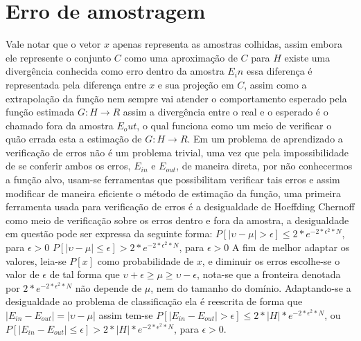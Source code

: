 \documentclass[pfc]{imetex}
\begin{document}
\section{Erro de amostragem}
   \newline
    Vale notar que o vetor $x$ apenas representa as amostras colhidas, assim embora ele represente o conjunto $C$ como uma aproximação de $C$ para $H$ existe uma divergência conhecida como erro dentro da amostra $E_in$ essa diferença é representada pela diferença entre $x$ e sua projeção em $C$, assim como a extrapolação da função nem sempre vai atender o comportamento esperado pela função estimada $G: H \rightarrow R$ assim a divergência entre o real e o esperado é o chamado fora da amostra $E_out$, o qual funciona como um meio de verificar o quão errada esta a estimação de $G: H \rightarrow R$.
    \newline
    Em um problema de aprendizado a verificação de erros não é um problema trivial, uma vez que pela impossibilidade de se conferir ambos os erros, $E_{in}$ e $E_{out}$, de maneira direta, por não conhecermos a função alvo, usam-se ferramentas que possibilitam verificar tais erros e assim modificar de maneira eficiente o método de estimação da função, uma primeira ferramenta usada para verificação de erros é a desigualdade de Hoeffding Chernoff como meio de verificação sobre os erros dentro e fora da amostra, a desigualdade em questão pode ser expressa da seguinte forma:
    \newline
    $P[|\upsilon - \mu|>\epsilon] \leq 2*e^{-2*\epsilon^2*N}$, para $\epsilon>0$
    \newline
    $P[|\upsilon - \mu|\leq\epsilon] > 2*e^{-2*\epsilon^2*N}$, para $\epsilon>0$
    \newline
    A fim de melhor adaptar os valores, leia-se $P[x]$ como probabilidade de $x$, e diminuir os erros escolhe-se o valor de $\epsilon$ de tal forma que $\upsilon + \epsilon \geq \mu \geq \upsilon - \epsilon$, nota-se que a fronteira denotada por $2*e^{-2*\epsilon^2*N}$ não depende de $\mu$, nem do tamanho do domínio.
    \newline
    Adaptando-se a desigualdade ao problema de classificação ela é reescrita de forma que $|E_{in}-E_{out}|=|\upsilon-\mu|$ assim tem-se
    $P[|E_{in}-E_{out}|>\epsilon] \leq 2*|H|*e^{-2*\epsilon^2*N}$, ou 
    $P[|E_{in}-E_{out}|\leq\epsilon] > 2*|H|*e^{-2*\epsilon^2*N}$, para $\epsilon>0$.
    \newline
\end{document}
